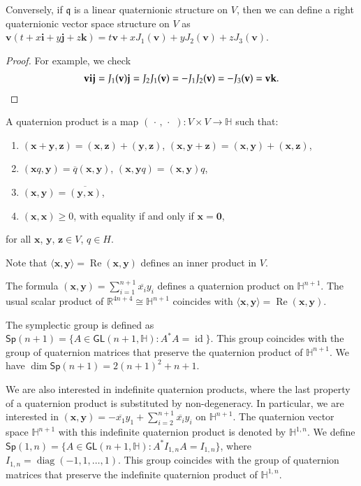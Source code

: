 \documentclass[12pt, a4paper,draft]{amsart}
\newcommand{\id}{\operatorname{id}}
\newcommand{\g}{\mathfrak}
\newcommand{\R}{\mathbb{R}}
\renewcommand{\H}{\mathbb{H}}
\renewcommand{\Re}{\operatorname{Re}}
\newcommand{\Sp}{\mathsf{Sp}}
\theoremstyle{remark}
\begin{document}
Conversely, if $\g{q}$ is a linear quaternionic structure on $V$, then we can define a right quaternionic vector space structure on $V$ as $\mathbf{v}(t+x\mathbf{i}+y\mathbf{j}+z\mathbf{k})=t\mathbf{v}+xJ_1(\mathbf{v})+yJ_2(\mathbf{v})+zJ_3(\mathbf{v})$.

\begin{proof}
For example, we check
\[
\begin{aligned}
\mathbf{v}\mathbf{i}\mathbf{j}
=J_1(\mathbf{v})\mathbf{j}
=J_2 J_1(\mathbf{v})
=-J_1 J_2(\mathbf{v})
=-J_3(\mathbf{v})
=\mathbf{v}\mathbf{k}.
\end{aligned} \qedhere
\]
\end{proof}
\medskip

A quaternion product is a map $(\,\cdot\,,\,\cdot\,\,)\colon V\times V\to\H$ such that:
\begin{enumerate}
\item $(\mathbf{x}+\mathbf{y},\mathbf{z})
=(\mathbf{x},\mathbf{z})+(\mathbf{y},\mathbf{z})$,
$(\mathbf{x},\mathbf{y}+\mathbf{z})
=(\mathbf{x},\mathbf{y})+(\mathbf{x},\mathbf{z})$,
\item $(\mathbf{x}q,\mathbf{y})=\overline{q}(\mathbf{x},\mathbf{y})$, $(\mathbf{x},\mathbf{y}q)=(\mathbf{x},\mathbf{y}) q$,
\item $(\mathbf{x},\mathbf{y})=\overline{(\mathbf{y},\mathbf{x})}$,
\item $(\mathbf{x},\mathbf{x})\geq 0$, with equality if and only if $\mathbf{x}=\mathbf{0}$,
\end{enumerate}
for all $\mathbf{x}$, $\mathbf{y}$, $\mathbf{z}\in V$, $q\in H$.

Note that $\langle\mathbf{x},\mathbf{y}\rangle=\Re(\mathbf{x},\mathbf{y})$ defines an inner product in $V$.

The formula $(\mathbf{x},\mathbf{y})=\sum_{i=1}^{n+1} \overline{x_i}y_i$ defines a quaternion product on $\H^{n+1}$. The usual scalar product of $\R^{4n+4}\cong\H^{n+1}$ coincides with $\langle\mathbf{x},\mathbf{y}\rangle=\Re(\mathbf{x},\mathbf{y})$.

The symplectic group is defined as $\Sp(n+1)=\{A\in\mathsf{GL}(n+1,\H):A^* A=\id\}$.
This group coincides with the group of quaternion matrices that preserve the quaternion product of $\H^{n+1}$.	
We have $\dim\Sp(n+1)=2(n+1)^2+n+1$.

We are also interested in indefinite quaternion products, where the last property of a quaternion product is substituted by non-degeneracy.
In particular, we are interested in $(\mathbf{x},\mathbf{y})=-\overline{x_1}y_1+\sum_{i=2}^{n+1} \overline{x_i}y_i$ on $\H^{n+1}$.
The quaternion vector space $\H^{n+1}$ with this indefinite quaternion product is denoted by $\H^{1,n}$.
We define $\Sp(1,n)=\{A\in\mathsf{GL}(n+1,\H):A^*I_{1,n}A=I_{1,n}\}$, where $I_{1,n}=\operatorname{diag}(-1,1,\dots,1)$.
This group coincides with the group of quaternion matrices that preserve the indefinite quaternion product of $\H^{1,n}$.	
\end{document}
